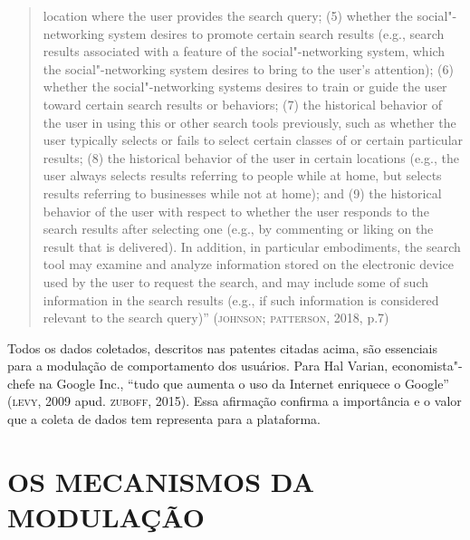 \begin{quote}
{  location where the user provides the search query; (5) whether the
  social"-networking system desires to promote certain search results
  (e.g., search results associated with a feature of the
  social"-networking system, which the social"-networking system desires
  to bring to the user's attention); (6) whether the social"-networking
  systems desires to train or guide the user toward certain search
  results or behaviors; (7) the historical behavior of the user in using
  this or other search tools previously, such as whether the user
  typically selects or fails to select certain classes of or certain
  particular results; (8) the historical behavior of the user in certain
  locations (e.g., the user always selects results referring to people
  while at home, but selects results referring to businesses while not
  at home); and (9) the historical behavior of the user with respect to
  whether the user responds to the search results after selecting one
  (e.g., by commenting or liking on the result that is delivered). In
  addition, in particular embodiments, the search tool may examine and
  analyze information stored on the electronic device used by the user
  to request the search, and may include some of such information in the
  search results (e.g., if such information is considered relevant to
  the search query)''} (\textsc{johnson; patterson}, 2018, p.7)
\end{quote}

Todos os dados coletados, descritos nas patentes citadas acima, são
essenciais para a modulação de comportamento dos usuários. Para Hal
Varian, economista"-chefe na Google Inc., ``tudo que aumenta o uso da
Internet enriquece o Google'' (\textsc{levy}, 2009 apud. \textsc{zuboff}, 2015). Essa
afirmação confirma a importância e o valor que a coleta de dados tem
representa para a plataforma.

\section{OS MECANISMOS DA MODULAÇÃO}

